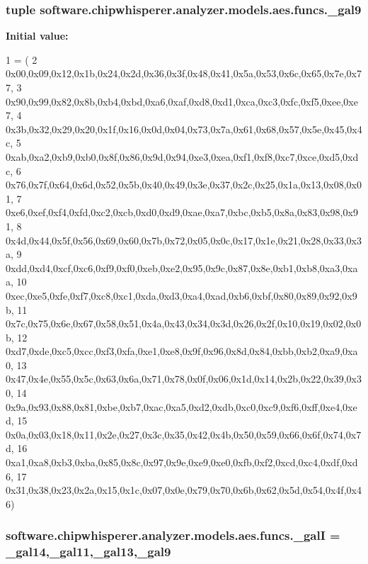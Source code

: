 \subsubsection[{\+\_\+gal9}]{\setlength{\rightskip}{0pt plus 5cm}tuple software.\+chipwhisperer.\+analyzer.\+models.\+aes.\+funcs.\+\_\+gal9}\label{namespacesoftware_1_1chipwhisperer_1_1analyzer_1_1models_1_1aes_1_1funcs_a2011fe4ad200e73bf8707fd98e2f74fb}
{\bfseries Initial value\+:}
\begin{DoxyCode}
1 = (
2 0x00,0x09,0x12,0x1b,0x24,0x2d,0x36,0x3f,0x48,0x41,0x5a,0x53,0x6c,0x65,0x7e,0x77,
3 0x90,0x99,0x82,0x8b,0xb4,0xbd,0xa6,0xaf,0xd8,0xd1,0xca,0xc3,0xfc,0xf5,0xee,0xe7,
4 0x3b,0x32,0x29,0x20,0x1f,0x16,0x0d,0x04,0x73,0x7a,0x61,0x68,0x57,0x5e,0x45,0x4c,
5 0xab,0xa2,0xb9,0xb0,0x8f,0x86,0x9d,0x94,0xe3,0xea,0xf1,0xf8,0xc7,0xce,0xd5,0xdc,
6 0x76,0x7f,0x64,0x6d,0x52,0x5b,0x40,0x49,0x3e,0x37,0x2c,0x25,0x1a,0x13,0x08,0x01,
7 0xe6,0xef,0xf4,0xfd,0xc2,0xcb,0xd0,0xd9,0xae,0xa7,0xbc,0xb5,0x8a,0x83,0x98,0x91,
8 0x4d,0x44,0x5f,0x56,0x69,0x60,0x7b,0x72,0x05,0x0c,0x17,0x1e,0x21,0x28,0x33,0x3a,
9 0xdd,0xd4,0xcf,0xc6,0xf9,0xf0,0xeb,0xe2,0x95,0x9c,0x87,0x8e,0xb1,0xb8,0xa3,0xaa,
10 0xec,0xe5,0xfe,0xf7,0xc8,0xc1,0xda,0xd3,0xa4,0xad,0xb6,0xbf,0x80,0x89,0x92,0x9b,
11 0x7c,0x75,0x6e,0x67,0x58,0x51,0x4a,0x43,0x34,0x3d,0x26,0x2f,0x10,0x19,0x02,0x0b,
12 0xd7,0xde,0xc5,0xcc,0xf3,0xfa,0xe1,0xe8,0x9f,0x96,0x8d,0x84,0xbb,0xb2,0xa9,0xa0,
13 0x47,0x4e,0x55,0x5c,0x63,0x6a,0x71,0x78,0x0f,0x06,0x1d,0x14,0x2b,0x22,0x39,0x30,
14 0x9a,0x93,0x88,0x81,0xbe,0xb7,0xac,0xa5,0xd2,0xdb,0xc0,0xc9,0xf6,0xff,0xe4,0xed,
15 0x0a,0x03,0x18,0x11,0x2e,0x27,0x3c,0x35,0x42,0x4b,0x50,0x59,0x66,0x6f,0x74,0x7d,
16 0xa1,0xa8,0xb3,0xba,0x85,0x8c,0x97,0x9e,0xe9,0xe0,0xfb,0xf2,0xcd,0xc4,0xdf,0xd6,
17 0x31,0x38,0x23,0x2a,0x15,0x1c,0x07,0x0e,0x79,0x70,0x6b,0x62,0x5d,0x54,0x4f,0x46)
\end{DoxyCode}
\hypertarget{namespacesoftware_1_1chipwhisperer_1_1analyzer_1_1models_1_1aes_1_1funcs_a6c94e463f40f4469f64a6ab291f5bee4}{}
\subsubsection[{\+\_\+gal\+I}]{\setlength{\rightskip}{0pt plus 5cm}software.\+chipwhisperer.\+analyzer.\+models.\+aes.\+funcs.\+\_\+gal\+I = {\bf \+\_\+gal14},{\bf \+\_\+gal11},{\bf \+\_\+gal13},{\bf \+\_\+gal9}}\label{namespacesoftware_1_1chipwhisperer_1_1analyzer_1_1models_1_1aes_1_1funcs_a6c94e463f40f4469f64a6ab291f5bee4}
\hypertarget{namespacesoftware_1_1chipwhisperer_1_1analyzer_1_1models_1_1aes_1_1funcs_afb5deac4e15ab6b70483bc948d039c6a}{}
